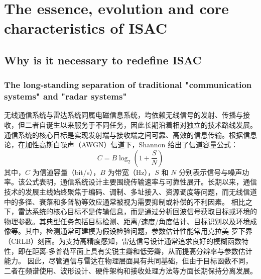 
\section{The essence, evolution and core characteristics of ISAC}
\label{sec:ch1-essential-definition}


\subsection{Why is it necessary to redefine ISAC}
\label{subsec:ch1-why-redefine-isac}
\subsubsection{The long-standing separation of traditional "communication systems" and "radar systems"}
\label{subsubsec:ch1-traditional-separation}
无线通信系统与雷达系统同属电磁信息系统，均依赖无线信号的发射、传播与接收，但二者自诞生以来服务于不同任务，因此长期沿着相对独立的技术路线发展。
通信系统的核心目标是实现发射端与接收端之间可靠、高效的信息传输。根据信息论，在加性高斯白噪声（AWGN）信道下，Shannon 给出了信道容量公式\cite{Shannon1948}：
\begin{equation}
C = B \log_2 \left( 1 + \frac{S}{N} \right)
\end{equation}
其中，$C$ 为信道容量（bit/s），$B$ 为带宽（Hz），$S$ 和 $N$ 分别表示信号与噪声功率。该公式表明，通信系统设计主要围绕传输速率与可靠性展开。长期以来，通信技术的发展主线始终聚焦于编码、调制、多址接入、资源调度等问题，而无线信道中的多径、衰落和多普勒等效应通常被视为需要抑制或补偿的不利因素\cite{Goldsmith2005,Andrews2014,TS38300}。
相比之下，雷达系统的核心目标不是传输信息，而是通过分析回波信号获取目标或环境的物理参数\cite{Skolnik2008,Richards2014}。其典型任务包括目标检测、距离/速度/角度估计、目标识别以及环境成像等。其中，检测通常可建模为假设检验问题，参数估计性能常用克拉美-罗下界（CRLB）刻画\cite{Kay1993}。为支持高精度感知，雷达信号设计通常追求良好的模糊函数特性，即在距离-多普勒平面上具有尖锐主瓣和低旁瓣，从而提高分辨率与参数估计能力\cite{Levanon2004,Richards2014}。
因此，尽管通信与雷达在物理层面具有共同基础，但由于目标函数不同，二者在频谱使用、波形设计、硬件架构和接收处理方法等方面长期保持分离发展\cite{Liu2020JointRadarComm,Liu2022ISAC,Zhang2021ISAC6G}。


